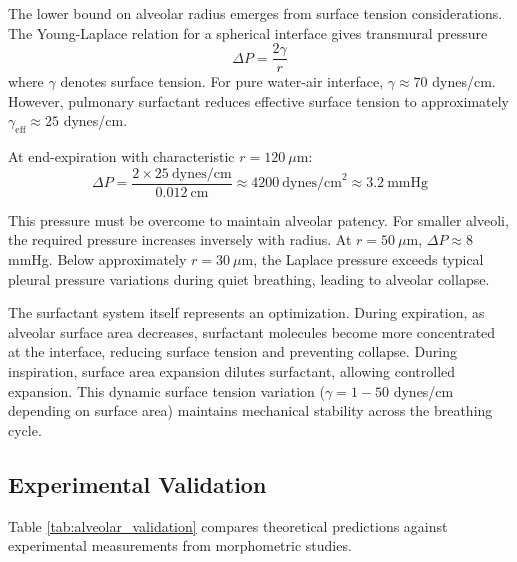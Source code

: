 \documentclass[10pt,twocolumn,a4paper]{article}
\theoremstyle{remark}
\begin{document}
The lower bound on alveolar radius emerges from surface tension considerations. The Young-Laplace relation for a spherical interface gives transmural pressure
\begin{equation}
\Delta P = \frac{2\gamma}{r}
\end{equation}
where $\gamma$ denotes surface tension. For pure water-air interface, $\gamma \approx 70$ dynes/cm. However, pulmonary surfactant reduces effective surface tension to approximately $\gamma_{\mathrm{eff}} \approx 25$ dynes/cm.

At end-expiration with characteristic $r = 120~\mu$m:
\begin{equation}
\Delta P = \frac{2 \times 25~\mathrm{dynes/cm}}{0.012~\mathrm{cm}} \approx 4200~\mathrm{dynes/cm}^{2} \approx 3.2~\mathrm{mmHg}
\end{equation}

This pressure must be overcome to maintain alveolar patency. For smaller alveoli, the required pressure increases inversely with radius. At $r = 50~\mu$m, $\Delta P \approx 8$ mmHg. Below approximately $r = 30~\mu$m, the Laplace pressure exceeds typical pleural pressure variations during quiet breathing, leading to alveolar collapse.

The surfactant system itself represents an optimization. During expiration, as alveolar surface area decreases, surfactant molecules become more concentrated at the interface, reducing surface tension and preventing collapse. During inspiration, surface area expansion dilutes surfactant, allowing controlled expansion. This dynamic surface tension variation ($\gamma = 1-50$ dynes/cm depending on surface area) maintains mechanical stability across the breathing cycle.

\subsection{Experimental Validation}

Table \ref{tab:alveolar_validation} compares theoretical predictions against experimental measurements from morphometric studies.
\end{document}
